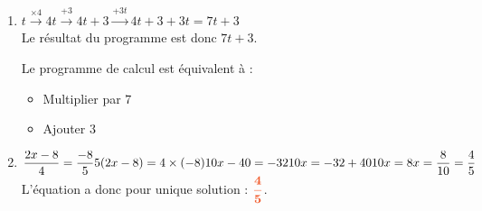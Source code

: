 \documentclass[a4paper,11pt]{article}
\begin{document}
\begin{seanceD}{}
\begin{enumerate}
\medskip
Il faut donc appliquer une hausse d'environ $35{,}14\,\%$ pour revenir au niveau de départ.

\item  $t\xrightarrow{\times  4} 4t\xrightarrow{+3}4t+3 \xrightarrow{+3t}4t+3+3t=7t+3$\\Le résultat du programme est donc $7t+3$.

\medskip
Le programme de calcul est équivalent à :	\begin{itemize}
		\item Multiplier par $7$
		\item Ajouter $3$
	\end{itemize}


\item $\dfrac{2x-8}{4}=\dfrac{-8}{5}\\
5( 2x-8 )=4 \times (-8)\\
10x-40=-32\\
10x=-32+40\\
10x=8\\
x=\dfrac{8}{10}=\dfrac{4}{5}$
\\L'équation a donc pour unique solution : ${\color[HTML]{f15929}\boldsymbol{\dfrac{4}{5}}}$.

\end{enumerate}
\end{seanceD}
\end{document}
